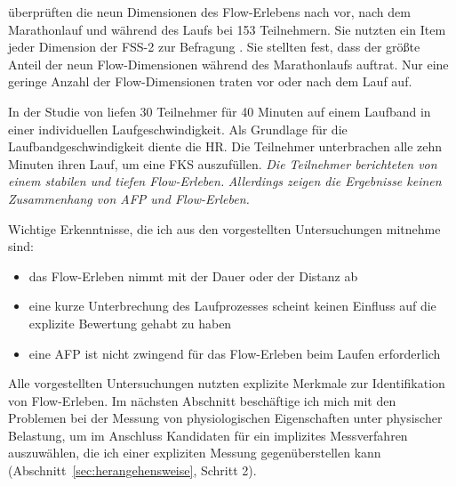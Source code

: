 \citet{Jimenez-Torres2013} überprüften die neun Dimensionen des Flow-Erlebens nach \citet{Csikszentmihalyi1992} vor, nach dem Marathonlauf und während des Laufs bei 153 Teilnehmern. Sie nutzten ein Item jeder Dimension der FSS-2 zur Befragung \citep{Jackson2002}. Sie stellten fest, dass der größte Anteil der neun Flow-Dimensionen während des Marathonlaufs auftrat. Nur eine geringe Anzahl der Flow-Dimensionen traten vor oder nach dem Lauf auf. 

In der Studie von \citet{Reinhardt2006} liefen 30 Teilnehmer für 40 Minuten auf einem Laufband in einer individuellen Laufgeschwindigkeit. Als Grundlage für die Laufbandgeschwindigkeit diente die \ac{HR}. Die Teilnehmer unterbrachen alle zehn Minuten ihren Lauf, um eine \ac{FKS} auszufüllen. \emph{Die Teilnehmer berichteten von einem stabilen und tiefen Flow-Erleben.} \emph{Allerdings zeigen die Ergebnisse keinen Zusammenhang von \ac{AFP} und Flow-Erleben.}

Wichtige Erkenntnisse, die ich aus den vorgestellten Untersuchungen mitnehme sind:
\begin{itemize}
	
	\item das Flow-Erleben nimmt mit der Dauer oder der Distanz ab
	
	\item eine kurze Unterbrechung des Laufprozesses scheint keinen Einfluss auf die explizite Bewertung gehabt zu haben
	
	\item eine \ac{AFP} ist nicht zwingend für das Flow-Erleben beim Laufen erforderlich
\end{itemize}

Alle vorgestellten Untersuchungen nutzten explizite Merkmale zur Identifikation von Flow-Erleben. Im nächsten Abschnitt beschäftige ich mich mit den Problemen bei der Messung von physiologischen Eigenschaften unter physischer Belastung, um im Anschluss Kandidaten für ein implizites Messverfahren auszuwählen, die ich einer expliziten Messung gegenüberstellen kann (Abschnitt~\ref{sec:herangehensweise}, Schritt 2). 

